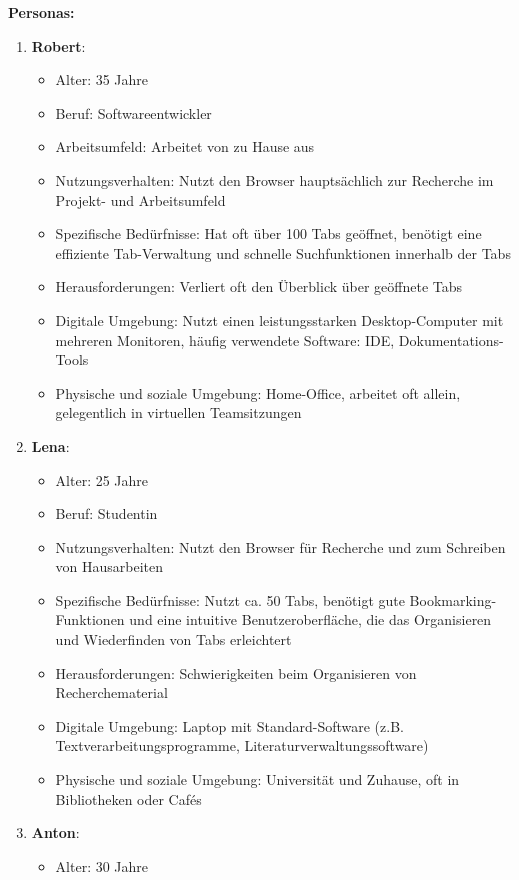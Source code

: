 \textbf{Personas:}
\begin{enumerate}
    \item \textbf{Robert}:
    \begin{itemize}
        \item Alter: 35 Jahre
        \item Beruf: Softwareentwickler
        \item Arbeitsumfeld: Arbeitet von zu Hause aus
        \item Nutzungsverhalten: Nutzt den Browser hauptsächlich zur Recherche im Projekt- und Arbeitsumfeld
        \item Spezifische Bedürfnisse: Hat oft über 100 Tabs geöffnet, benötigt eine effiziente Tab-Verwaltung und schnelle Suchfunktionen innerhalb der Tabs
        \item Herausforderungen: Verliert oft den Überblick über geöffnete Tabs
        \item Digitale Umgebung: Nutzt einen leistungsstarken Desktop-Computer mit mehreren Monitoren, häufig verwendete Software: IDE, Dokumentations-Tools
        \item Physische und soziale Umgebung: Home-Office, arbeitet oft allein, gelegentlich in virtuellen Teamsitzungen
    \end{itemize}
    \item \textbf{Lena}:
    \begin{itemize}
        \item Alter: 25 Jahre
        \item Beruf: Studentin
        \item Nutzungsverhalten: Nutzt den Browser für Recherche und zum Schreiben von Hausarbeiten
        \item Spezifische Bedürfnisse: Nutzt ca. 50 Tabs, benötigt gute Bookmarking-Funktionen und eine intuitive Benutzeroberfläche, die das Organisieren und Wiederfinden von Tabs erleichtert
        \item Herausforderungen: Schwierigkeiten beim Organisieren von Recherchematerial
        \item Digitale Umgebung: Laptop mit Standard-Software (z.B. Textverarbeitungsprogramme, Literaturverwaltungssoftware)
        \item Physische und soziale Umgebung: Universität und Zuhause, oft in Bibliotheken oder Cafés
    \end{itemize}
    \item \textbf{Anton}:
    \begin{itemize}
        \item Alter: 30 Jahre

\end{itemize}
\end{enumerate}
